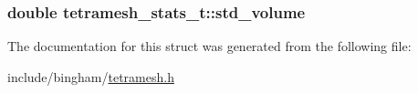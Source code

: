 \label{structtetramesh__stats__t_a57c699b5d94bebb33b726773fa8e7997}
\hypertarget{structtetramesh__stats__t_a398e67e0fff1c301ce3be6b840518851}{
\subsubsection[{std\_\-volume}]{\setlength{\rightskip}{0pt plus 5cm}double {\bf tetramesh\_\-stats\_\-t::std\_\-volume}}}
\label{structtetramesh__stats__t_a398e67e0fff1c301ce3be6b840518851}


The documentation for this struct was generated from the following file:\begin{DoxyCompactItemize}
\item 
include/bingham/\hyperlink{tetramesh_8h}{tetramesh.h}\end{DoxyCompactItemize}
